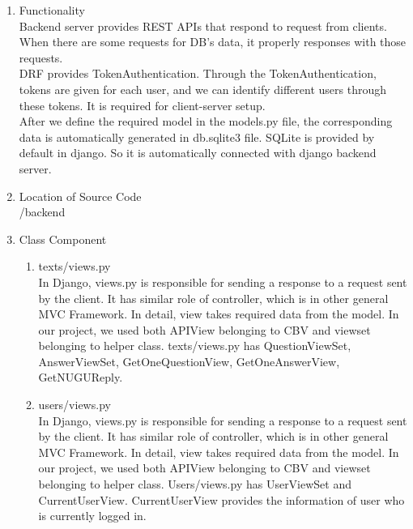 \documentclass[conference]{IEEEtran}
\begin{document}
\begin{enumerate}
\begin{enumerate}
        \item Functionality
        \\Backend server provides REST APIs that respond to request from clients. When there are some requests for DB’s data, it properly responses with those requests.\\
        DRF provides TokenAuthentication. Through the TokenAuthentication, tokens are given for each user, and we can identify different users through these tokens. It is required for client-server setup.\\
        After we define the required model in the models.py file, the corresponding data is automatically generated in db.sqlite3 file. SQLite is provided by default in django. So it is automatically connected with django backend server.
        
        \item Location of Source Code
        \\/backend
        
        \item Class Component
        \begin{enumerate}
            \item texts/views.py
            \\In Django, views.py is responsible for sending a response to a request sent by the client. It has similar role of controller, which is in other general MVC Framework. In detail, view takes required data from the model. In our project, we used both APIView belonging to CBV and viewset belonging to helper class. texts/views.py has QuestionViewSet, AnswerViewSet, GetOneQuestionView, GetOneAnswerView, GetNUGUReply.
            \item users/views.py
            \\In Django, views.py is responsible for sending a response to a request sent by the client. It has similar role of controller, which is in other general MVC Framework. In detail, view takes required data from the model. In our project, we used both APIView belonging to CBV and viewset belonging to helper class. Users/views.py has UserViewSet and CurrentUserView. CurrentUserView provides the information of user who is currently logged in.


\end{enumerate}
\end{enumerate}
\end{enumerate}
\end{document}
